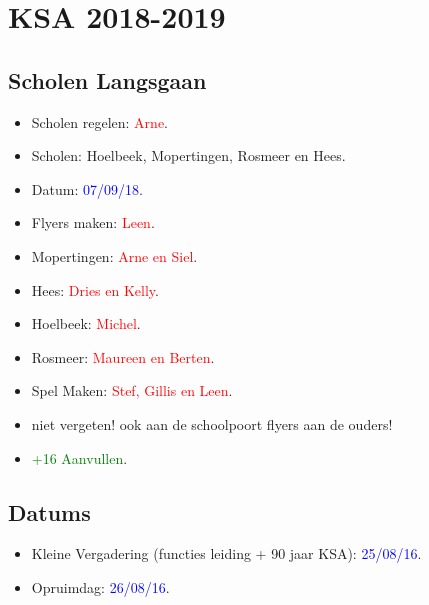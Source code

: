 \documentclass[pdftex,12pt,a4paper,english,titlepage]{article}
\begin{document}
\section{KSA 2018-2019}

\subsection{Scholen Langsgaan}
\begin{itemize}
	\item Scholen regelen: \textcolor{red}{Arne}.
	\item Scholen: Hoelbeek, Mopertingen, Rosmeer en Hees.
	\item Datum: \textcolor{blue}{07/09/18}.
	\item Flyers maken: \textcolor{red}{Leen}.
	\item Mopertingen: \textcolor{red}{Arne en Siel}.
	\item Hees: \textcolor{red}{Dries en Kelly}.
	\item Hoelbeek: \textcolor{red}{Michel}.
	\item Rosmeer: \textcolor{red}{Maureen en Berten}.
	\item Spel Maken: \textcolor{red}{Stef, Gillis en Leen}.
	\item niet vergeten! ook aan de schoolpoort flyers aan de ouders!
	\item \textcolor{green}{+16 Aanvullen}.
\end{itemize}

\subsection{Datums}
\begin{itemize}
	\item Kleine Vergadering (functies leiding + 90 jaar KSA): \textcolor{blue}{25/08/16}.
	\item Opruimdag: \textcolor{blue}{26/08/16}.
\end{itemize}
\end{document}
